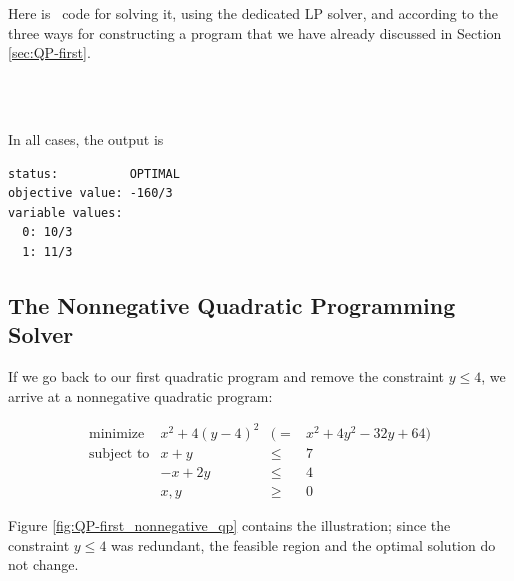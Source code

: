 Here is \cgal\ code for solving it, using the dedicated LP solver, and
according to the three ways for constructing a program that we have
already discussed in Section \ref{sec:QP-first}. 

\\
\\

In all cases, the output is
\begin{verbatim}
status:          OPTIMAL
objective value: -160/3
variable values:
  0: 10/3
  1: 11/3
\end{verbatim}

\subsection{The  Nonnegative Quadratic Programming Solver}
If we go back to our first quadratic program and
remove the constraint $y\leq 4$, we arrive at a nonnegative quadratic
program: 

\[
\begin{array}{lrcl}
\mbox{minimize}       & x^2 + 4(y-4)^2 &(=& x^2 + 4y^2 - 32y + 64) \\
\mbox{subject to}     & x + y &\leq& 7 \\
                      & -x + 2y &\leq& 4 \\
                      & x,y &\geq& 0
\end{array}
\]

Figure \ref{fig:QP-first_nonnegative_qp} contains 
the illustration; since the constraint $y\leq 4$ was 
redundant, the feasible region and the optimal solution do 
not change. 


